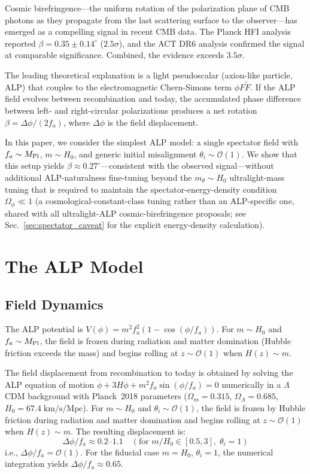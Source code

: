 \documentclass[a4paper,11pt]{article}
\begin{document}
Cosmic birefringence---the uniform rotation of the polarization plane of CMB photons as they propagate from the last scattering surface to the observer---has emerged as a compelling signal in recent CMB data. The Planck HFI analysis~\citep{Minami2020} reported $\beta = 0.35 \pm 0.14^\circ$ ($2.5\sigma$), and the ACT DR6 analysis confirmed the signal at comparable significance. Combined, the evidence exceeds $3.5\sigma$.

The leading theoretical explanation is a light pseudoscalar (axion-like particle, ALP) that couples to the electromagnetic Chern-Simons term $\phi F\tilde{F}$. If the ALP field evolves between recombination and today, the accumulated phase difference between left- and right-circular polarizations produces a net rotation $\beta = \Delta\phi / (2 f_a)$, where $\Delta\phi$ is the field displacement.

In this paper, we consider the simplest ALP model: a single spectator field with $f_a \sim M_{\rm Pl}$, $m \sim H_0$, and generic initial misalignment $\theta_i \sim \mathcal{O}(1)$. We show that this setup yields $\beta \approx 0.27^\circ$---consistent with the observed signal---without additional ALP-naturalness fine-tuning beyond the $m_\theta \sim H_0$ ultralight-mass tuning that is required to maintain the spectator-energy-density condition $\Omega_\phi\!\ll\!1$ (a cosmological-constant-class tuning rather than an ALP-specific one, shared with all ultralight-ALP cosmic-birefringence proposals; see Sec.~\ref{sec:spectator_caveat} for the explicit energy-density calculation).

\section{The ALP Model}

\subsection{Field Dynamics}

The ALP potential is $V(\phi) = m^2 f_a^2 (1 - \cos(\phi/f_a))$. For $m \sim H_0$ and $f_a \sim M_{\rm Pl}$, the field is frozen during radiation and matter domination (Hubble friction exceeds the mass) and begins rolling at $z \sim \mathcal{O}(1)$ when $H(z) \sim m$.

The field displacement from recombination to today is obtained by solving the ALP equation of motion $\ddot{\phi} + 3H\dot{\phi} + m^2 f_a \sin(\phi/f_a) = 0$ numerically in a $\Lambda$CDM background with Planck~2018 parameters ($\Omega_m = 0.315$, $\Omega_\Lambda = 0.685$, $H_0 = 67.4\;\text{km/s/Mpc}$). For $m \sim H_0$ and $\theta_i \sim \mathcal{O}(1)$, the field is frozen by Hubble friction during radiation and matter domination and begins rolling at $z \sim \mathcal{O}(1)$ when $H(z) \sim m$. The resulting displacement is:
\begin{equation}\label{eq:field}
\Delta\phi / f_a \approx 0.2\text{--}1.1 \quad (\text{for } m/H_0 \in [0.5, 3],\; \theta_i = 1)
\end{equation}
i.e., $\Delta\phi / f_a = \mathcal{O}(1)$. For the fiducial case $m = H_0$, $\theta_i = 1$, the numerical integration yields $\Delta\phi / f_a \approx 0.65$.
\end{document}
